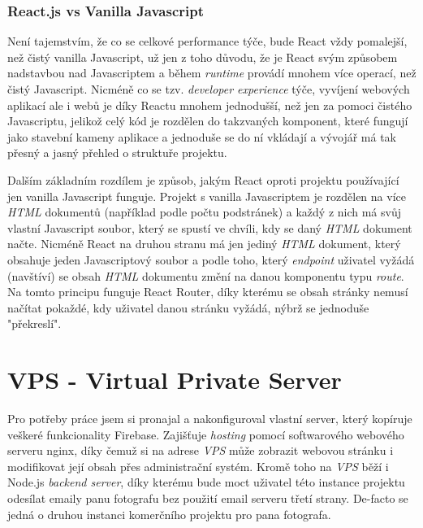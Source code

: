 \documentclass[12pt,a4paper]{report}
\begin{document}
  \subsection{React.js vs Vanilla Javascript}
  Není tajemstvím, že co se celkové performance týče, bude React vždy pomalejší, než čistý vanilla Javascript, už jen 
  z toho důvodu, že je React svým způsobem nadstavbou nad Javascriptem a během \emph{runtime} provádí mnohem více operací, než čistý Javascript.
  Nicméně co se tzv. \emph{developer experience} týče, vyvíjení webových aplikací ale i webů je díky Reactu mnohem jednodušší, než jen
  za pomoci čistého Javascriptu, jelikož celý kód je rozdělen do takzvaných komponent, které fungují jako stavební kameny aplikace a jednoduše se 
  do ní vkládají a vývojář má tak přesný a jasný přehled o struktuře projektu. 

  Dalším základním rozdílem je způsob, jakým React oproti projektu používající jen vanilla Javascript funguje.
  Projekt s vanilla Javascriptem je rozdělen na více \emph{HTML} dokumentů (například podle počtu podstránek) a každý z nich má svůj vlastní 
  Javascript soubor, který se spustí ve chvíli, kdy se daný \emph{HTML} dokument načte.
  Nicméně React na druhou stranu má jen jediný \emph{HTML} dokument, který obsahuje jeden Javascriptový soubor a podle toho,
  který \emph{endpoint} uživatel vyžádá (navštíví) se obsah \emph{HTML} dokumentu změní na danou komponentu typu \emph{route}.
  Na tomto principu funguje React Router, díky kterému se obsah stránky nemusí načítat pokaždé, kdy uživatel danou stránku vyžádá,
  nýbrž se jednoduše "překreslí".
 
  \chapter{VPS - Virtual Private Server}
   Pro potřeby práce jsem si pronajal a nakonfiguroval vlastní server, který kopíruje veškeré funkcionality
   Firebase. Zajišťuje \emph{hosting} pomocí softwarového webového serveru nginx, díky čemuž si na adrese \emph{VPS} může
   zobrazit webovou stránku i modifikovat její obsah přes administrační systém. Kromě toho na \emph{VPS} běží i Node.js \emph{backend server},
   díky kterému bude moct uživatel této instance projektu odesílat emaily panu fotografu bez použití email serveru třetí strany. 
   De-facto se jedná o druhou instanci komerčního projektu pro pana fotografa. 
\end{document}
